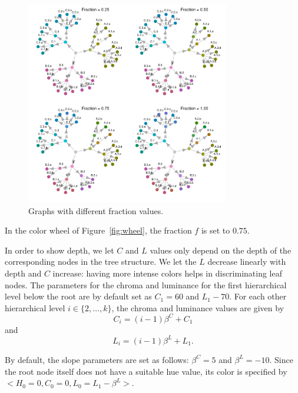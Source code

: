 \documentclass[journal]{vgtc}                %
\begin{document}
\begin{figure}[htb]
  \centering
  \includegraphics[width=3.5in]{Graph_hue.pdf}
  \caption{Graphs with different fraction values.}\label{fig:graphf}
\end{figure}






In the color wheel of Figure~\ref{fig:wheel}, the fraction $f$ is set to $0.75$.




In order to show depth, we let $C$ and $L$ values only depend on the depth of the corresponding nodes in the tree structure. We let the $L$ decrease linearly with depth and $C$ increase: having more intense colors helps in discriminating leaf nodes. The parameters for the chroma and luminance for the first hierarchical level below the root are by default set as $C_1=60$ and $L_1-70$. For each other hierarchical level $i \in \{2, \ldots, k\}$, the chroma and luminance values are given by
\begin{equation}
C_i=(i-1)\beta^C + C_1
\end{equation}
and
\begin{equation}
L_i=(i-1)\beta^L + L_1.
\end{equation}

By default, the slope parameters are set as follows: $\beta^C=5$ and $\beta^L=-10$. Since the root node itself does not have a suitable hue value, its color is specified by $<H_0=0, C_0=0, L_0=L_1-\beta^L>$.
\end{document}
